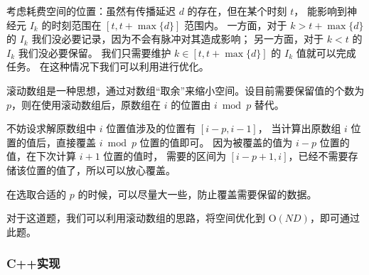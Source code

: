 考虑耗费空间的位置：虽然有传播延迟 $d$ 的存在，但在某个时刻 $t$，
能影响到神经元 $I_k$ 的时刻范围在 $[t, t+\max\{d\}]$ 范围内。
一方面，对于 $k>t+\max\{d\}$ 的 $I_k$ 我们没必要记录，因为不会有脉冲对其造成影响；
另一方面，对于 $k<t$ 的 $I_k$ 我们没必要保留。
我们只需要维护 $k\in [t, t+\max\{d\}]$ 的 $I_k$ 值就可以完成任务。
在这种情况下我们可以利用{}进行优化。

\begin{definition}[滚动数组] \label{def:scroll array}
    \hspace{2em} 滚动数组是一种思想，通过对数组“取余”来缩小空间。设目前需要保留值的个数为 $p$，则在使用滚动数组后，原数组在 $i$ 的位置由 $i \bmod p$ 替代。

    \hspace{2em} 不妨设求解原数组中 $i$ 位置值涉及的位置有 $[i-p, i-1]$，
    当计算出原数组 $i$ 位置的值后，直接覆盖 $i \bmod p$ 位置的值即可。
    因为被覆盖的值为 $i-p$ 位置的值，在下次计算 $i+1$ 位置的值时，
    需要的区间为 $[i-p+1,i]$，已经不需要存储该位置的值了，所以可以放心覆盖。

    \hspace{2em} 在选取合适的 $p$ 的时候，可以尽量大一些，防止覆盖需要保留的数据。
\end{definition}

对于这道题，我们可以利用滚动数组的思路，将空间优化到 $\mathrm{O}(ND)$，即可通过此题。

\subsubsection{C++实现}

